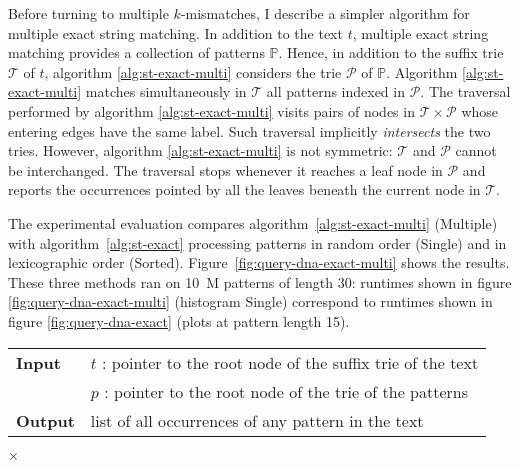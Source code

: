 Before turning to multiple $k$-mismatches, I describe a simpler algorithm for multiple exact string matching.
In addition to the text $t$, multiple exact string matching provides a collection of patterns $\mathbb{P}$.
Hence, in addition to the suffix trie $\mathcal{T}$ of $t$, algorithm \ref{alg:st-exact-multi} considers the trie $\mathcal{P}$ of $\mathbb{P}$.
Algorithm \ref{alg:st-exact-multi} matches simultaneously in $\mathcal{T}$ all patterns indexed in $\mathcal{P}$.
The traversal performed by algorithm \ref{alg:st-exact-multi} visits pairs of nodes in $\mathcal{T} \times \mathcal{P}$ whose entering edges have the same label.
Such traversal implicitly \emph{intersects} the two tries.
However, algorithm \ref{alg:st-exact-multi} is not symmetric: $\mathcal{T}$ and $\mathcal{P}$ cannot be interchanged.
The traversal stops whenever it reaches a leaf node in $\mathcal{P}$ and reports the occurrences pointed by all the leaves beneath the current node in $\mathcal{T}$.

The experimental evaluation compares algorithm~\ref{alg:st-exact-multi} (Multiple) with algorithm~\ref{alg:st-exact} processing patterns in random order (Single) and in lexicographic order (Sorted).
Figure~\ref{fig:query-dna-exact-multi} shows the results.
These three methods ran on 10~M patterns of length 30: runtimes shown in figure \ref{fig:query-dna-exact-multi} (histogram Single) correspond to runtimes shown in figure \ref{fig:query-dna-exact} (plots at pattern length 15).

\begin{figure*}[t]
\begin{center}
\begin{minipage}[t]{.8\textwidth}
\begin{algorithm}[H]
\begin{tabular}{ll}
\textbf{Input}  & $t$ : pointer to the root node of the suffix trie of the text\\
 			    & $p$ : pointer to the root node of the trie of the patterns\\
\textbf{Output} & list of all occurrences of any pattern in the text\\
\end{tabular}
\begin{algorithmic}[1]
	\State \Report {} $\times$ 
\Else
	\State {}
	\Repeat
			\State {}
			\State {}
		\EndIf
\EndIf
\end{algorithmic}
\label{alg:st-exact-multi}
\end{algorithm}
\end{minipage}
\end{center}
\end{figure*}

